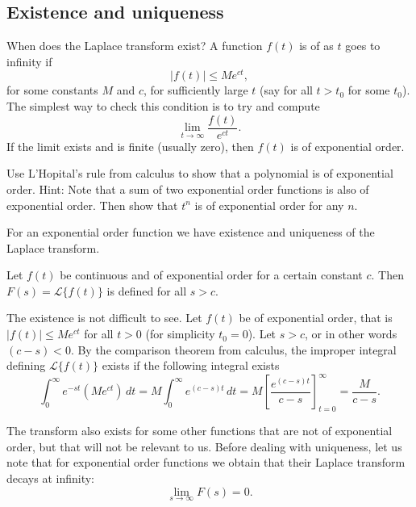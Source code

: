 \documentclass{ximera}
\begin{document}
\subsection{Existence and uniqueness}

When does the Laplace transform exist?  A function $f(t)$ is of \emph{} as $t$ goes to infinity if
\begin{equation*}
    \lvert f(t) \rvert \leq M e^{ct} ,
\end{equation*}
for some constants $M$ and $c$, for sufficiently large $t$ (say for all $t > t_0$ for some $t_0$).  The simplest way to check this condition is to try and compute
\begin{equation*}
    \lim_{t\to \infty} \frac{f(t)}{e^{ct}} .
\end{equation*}
If the limit exists and is finite (usually zero), then $f(t)$ is of exponential order.

\begin{exercise}
    Use L'Hopital's rule from calculus to show that a polynomial is of exponential order.  Hint: Note that a sum of two exponential order functions is also of exponential order.  Then show that $t^n$ is of exponential order for any $n$.
\end{exercise}

For an exponential order function we have existence and uniqueness of the Laplace transform.

\begin{theorem}[Existence]
    Let $f(t)$ be continuous and of exponential order for a certain constant $c$.  Then $F(s) = \mathcal{L} \bigl\{ f(t) \bigr\}$ is defined for all $s > c$.
\end{theorem}

The existence is not difficult to see.  Let $f(t)$ be of exponential order, that is $\lvert f(t) \rvert \leq M e^{ct}$ for all $t > 0$ (for simplicity $t_0 = 0$). Let $s > c$, or in other words $(c-s) < 0$. By the comparison theorem from calculus, the improper integral defining $\mathcal{L} \bigl\{ f(t) \bigr\}$ exists if the following integral exists
\begin{equation*}
    \int_0^\infty e^{-st} ( M e^{ct} ) \,dt = M \int_0^\infty e^{(c-s)t} \,dt = M \left[ \frac{e^{(c-s)t}}{c-s} \right]_{t=0}^\infty = \frac{M}{c-s} .
\end{equation*}

The transform also exists for some other functions that are not of exponential order, but that will not be relevant to us. Before dealing with uniqueness, let us note that for exponential order functions we obtain that their Laplace transform decays at infinity:
\begin{equation*}
    \lim_{s\to\infty} F(s) = 0 .
\end{equation*}
\end{document}
